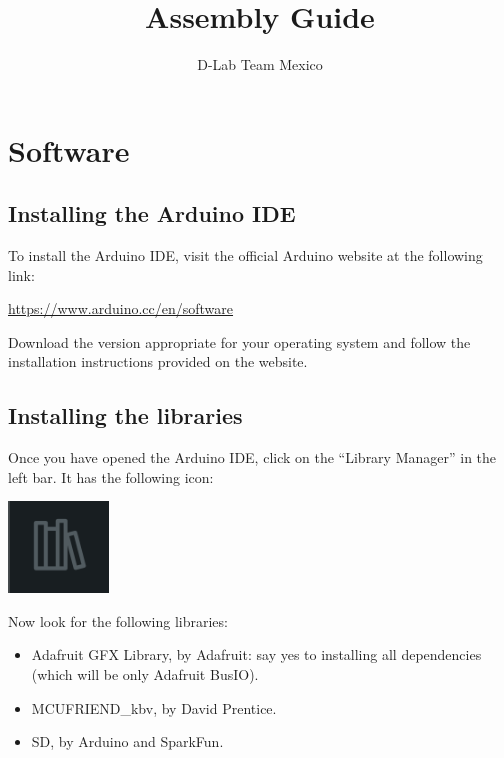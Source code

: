 \documentclass{article}
\title{Assembly Guide}
\author{D-Lab Team Mexico}
\begin{document}
\maketitle

\tableofcontents
\vspace{2cm} 
\clearpage
{}
\section{Software}\label{sec:software}
\subsection{Installing the Arduino IDE}
To install the Arduino IDE, visit the official Arduino website at the following link:

\href{https://www.arduino.cc/en/software}{https://www.arduino.cc/en/software}

\noindent
Download the version appropriate for your operating system and follow the installation instructions provided on the website.

\subsection{Installing the libraries}


Once you have opened the Arduino IDE, click on the ``Library Manager'' in the left bar. It has the following icon:

\vspace{1em}
\begin{center}
    \includegraphics[width=0.2\textwidth]{../images/library_manager.png}
\end{center}

Now look for the following libraries:

\begin{itemize}
    \item Adafruit GFX Library, by Adafruit: say yes to installing all dependencies (which will be only Adafruit BusIO).
    \item MCUFRIEND\_kbv, by David Prentice.
    \item SD, by Arduino and SparkFun.
\end{itemize}
\end{document}

